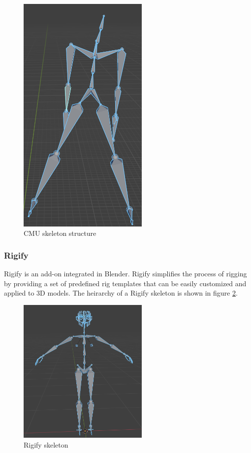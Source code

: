 \documentclass[../../main.tex]{subfiles}
\begin{document}
\begin{figure}
  \centering \includegraphics[width = 2.5in]{chapters/background_work/images/cmu_skeleton.png}
  \caption{CMU skeleton structure}
  \label{fig:cmu_skeleton}
\end{figure}

\subsubsection{Rigify}

Rigify is an add-on integrated in Blender. Rigify simplifies the process of rigging by providing a set of predefined rig templates that can be easily customized and applied to 3D models. The heirarchy of a Rigify skeleton is shown in figure \ref{fig:rigify_skeleton}.

\begin{figure}
  \centering \includegraphics[width = 2.5in]{chapters/background_work/images/rigify_skeleton.png}
  \caption{Rigify skeleton}
  \label{fig:rigify_skeleton}
\end{figure}
\end{document}
